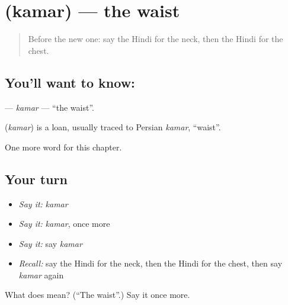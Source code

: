 \section[\texorpdfstring{\hi{कमर} (kamar)}{कमर (kamar)}]{ (kamar) — the waist}

\label{lesson:HI-C151-kamar}



\begin{quote}
Before the new one: say the Hindi for the neck, then the Hindi for the chest.
\end{quote}

\subsection*{You'll want to know: }
\textbf{} — \emph{kamar} — \textquotedblleft{}the waist\textquotedblright{}.

\begin{cousinweb}
\textbf{} (\emph{kamar}) is a loan, usually traced to Persian \emph{kamar}, \textquotedblleft{}waist\textquotedblright{}.
\end{cousinweb}

\begin{grammarlens}[title={What you've built}]
One more word for this chapter.
\end{grammarlens}

\subsection*{Your turn}
\begin{itemize}
\raggedright
  \item \emph{Say it:} \emph{kamar}
  \item \emph{Say it:} \emph{kamar}, once more
  \item \emph{Say it:} say \emph{kamar}
  \item \emph{Recall:} say the Hindi for the neck, then the Hindi for the chest, then say \emph{kamar} again
\end{itemize}

\begin{tcolorbox}[breakable,colback=teal!4,colframe=teal!35!black,title={Before you move on}]
What does  mean? (\textquotedblleft{}The waist\textquotedblright{}.) Say it once more.
\end{tcolorbox}
